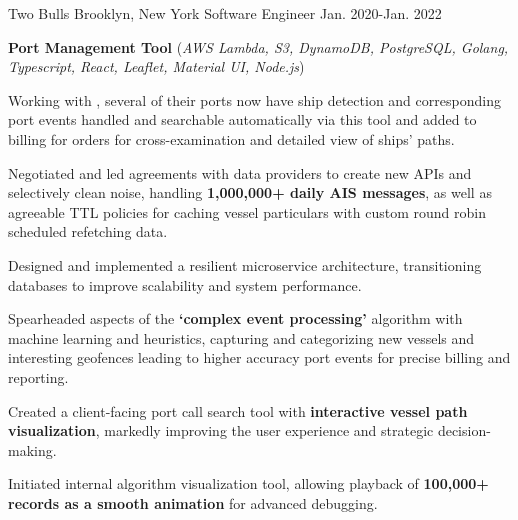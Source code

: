 \begin{cventries}
  \nrolecventrynoitems
    {Two Bulls} %
    {Brooklyn, New York} %
    {Software Engineer} %
    {Jan. 2020-Jan. 2022} %
    {} %
    {} %
    {} %
    {} %

  \cvcustombodydescription
      {\textbf{Port Management Tool} (\emph{AWS Lambda, S3, DynamoDB, PostgreSQL, Golang, Typescript, React, Leaflet, Material UI, Node.js})}
      {
      \begin{cvtightprose} %
        {Working with , several of their ports now have ship detection and corresponding port events handled and searchable automatically via this tool and added to billing for  orders for cross-examination and detailed view of ships' paths.}
      \end{cvtightprose}
      }
      {
      \begin{cvitems} %
        \item{Negotiated and led agreements with data providers to create new APIs and selectively clean noise, handling \textbf{1,000,000+ daily AIS messages}, as well as agreeable TTL policies for caching vessel particulars with custom round robin scheduled refetching data.}
        \item{Designed and implemented a resilient microservice architecture, transitioning databases to improve scalability and system performance.}
        \item{Spearheaded aspects of the \textbf{`complex event processing'} algorithm with machine learning and heuristics, capturing and categorizing new vessels and interesting geofences leading to higher accuracy port events for precise billing and reporting.}
        \item{Created a client-facing port call search tool with \textbf{interactive vessel path visualization}, markedly improving the user experience and strategic decision-making.}
        \item{Initiated internal algorithm visualization tool, allowing playback of \textbf{100,000+ records as a smooth animation} for advanced debugging.}
      \end{cvitems}
    }


\end{cventries}

